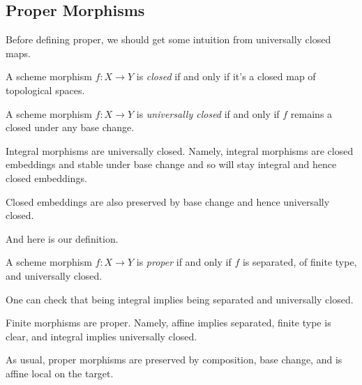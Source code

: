 \documentclass[../notes.tex]{subfiles}
\begin{document}
\subsection{Proper Morphisms}
Before defining proper, we should get some intuition from universally closed maps.
\begin{definition}
	A scheme morphism $f\colon X\to Y$ is \textit{closed} if and only if it's a closed map of topological spaces.
\end{definition}
\begin{definition}
	A scheme morphism $f\colon X\to Y$ is \textit{universally closed} if and only if $f$ remains a closed under any base change.
\end{definition}
\begin{example}
	Integral morphisms are universally closed. Namely, integral morphisms are closed embeddings and stable under base change and so will stay integral and hence closed embeddings.
\end{example}
\begin{example}
	Closed embeddings are also preserved by base change and hence universally closed.
\end{example}
And here is our definition.
\begin{definition}[Proper]
	A scheme morphism $f\colon X\to Y$ is \textit{proper} if and only if $f$ is separated, of finite type, and universally closed.
\end{definition}
\begin{remark}
	One can check that being integral implies being separated and universally closed.
\end{remark}
\begin{example}
	Finite morphisms are proper. Namely, affine implies separated, finite type is clear, and integral implies universally closed.
\end{example}
\begin{remark}
	As usual, proper morphisms are preserved by composition, base change, and is affine local on the target.
\end{remark}
\end{document}
